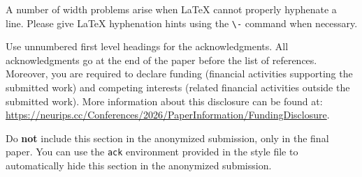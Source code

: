 \documentclass{article}
\begin{document}
A number of width problems arise when \LaTeX{} cannot properly hyphenate a
line. Please give LaTeX hyphenation hints using the \verb+\-+ command when
necessary.

\begin{ack}
Use unnumbered first level headings for the acknowledgments. All acknowledgments
go at the end of the paper before the list of references. Moreover, you are required to declare
funding (financial activities supporting the submitted work) and competing interests (related financial activities outside the submitted work).
More information about this disclosure can be found at: \url{https://neurips.cc/Conferences/2026/PaperInformation/FundingDisclosure}.


Do {\bf not} include this section in the anonymized submission, only in the final paper. You can use the \texttt{ack} environment provided in the style file to automatically hide this section in the anonymized submission.
\end{ack}













\end{document}
